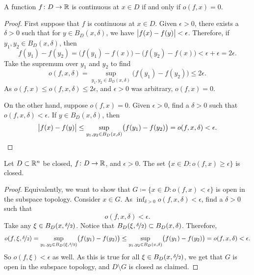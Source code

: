 \begin{prop}
\pagebreak[2]
A function
$f \colon D \to {\mathbb{R}}$ is continuous at $x \in D$ if and only if $o(f,x) = 0$.
\end{prop}

\begin{proof}
First suppose that $f$ is continuous at $x \in D$.  Given $\epsilon > 0$,
there exists a $\delta > 0$ such that for $y \in B_D(x,\delta)$,
we have $\bigl\lvert {f(x)-f(y)} \bigr\rvert < \epsilon$.  Therefore, if $y_1,y_2 \in
B_D(x,\delta)$, then
\begin{equation*}
f(y_1)-f(y_2) =
\bigl(f(y_1)-f(x)\bigr)-\bigl(f(y_2)-f(x)\bigr) < \epsilon + \epsilon = 2 \epsilon .
\end{equation*}
Take the supremum over $y_1$ and $y_2$ to find
\begin{equation*}
o(f,x,\delta) = 
\sup_{y_1,y_2 \in B_D(x,\delta)} \bigl(f(y_1)-f(y_2)\bigr)
\leq
2 \epsilon .
\end{equation*}
As $o(f,x) \leq o(f,x,\delta) \leq 2\epsilon$, and $\epsilon > 0$ was arbitrary,
$o(f,x) = 0$.

On the other hand, suppose $o(f,x) = 0$.  Given $\epsilon > 0$,
find a $\delta > 0$ such that $o(f,x,\delta) < \epsilon$.  If
$y \in B_D(x,\delta)$, then
\begin{equation*}
\bigl\lvert {f(x)-f(y)} \bigr\rvert
\leq
\sup_{y_1,y_2 \in B_D(x,\delta)} \bigl(f(y_1)-f(y_2)\bigr)
=
o(f,x,\delta) < \epsilon. \qedhere
\end{equation*}
\end{proof}

\begin{prop} \label{prop:seclosed}
Let $D \subset {\mathbb{R}}^n$ be closed,
$f \colon D \to {\mathbb{R}}$, and $\epsilon > 0$.
The set $\bigl\{ x \in D : o(f,x) \geq \epsilon \bigr\}$ is closed.
\end{prop}

\begin{proof}
Equivalently, we want to show that
$G \coloneqq \bigl\{ x \in D : o(f,x) < \epsilon \bigr\}$ is open in the subspace topology.
Consider $x \in G$.
As $\inf_{\delta > 0} o(f,x,\delta) < \epsilon$, find a $\delta > 0$ such
that
\begin{equation*}
o(f,x,\delta) < \epsilon .
\end{equation*}
Take any $\xi \in B_D(x,\nicefrac{\delta}{2})$.  Notice that
$B_D(\xi,\nicefrac{\delta}{2}) \subset B_D(x,\delta)$.  Therefore,
\begin{equation*}
o(f,\xi,\nicefrac{\delta}{2}) =
\sup_{y_1,y_2 \in B_D(\xi,\nicefrac{\delta}{2})} \bigl(f(y_1)-f(y_2)\bigr) 
\leq
\sup_{y_1,y_2 \in B_D(x,\delta)} \bigl(f(y_1)-f(y_2)\bigr) = o(f,x,\delta) <
\epsilon .
\end{equation*}
So $o(f,\xi) < \epsilon$ as well.  As this is true for all $\xi \in
B_D(x,\nicefrac{\delta}{2})$, we get that $G$ is open in the subspace
topology, and $D \setminus G$ is closed as claimed.
\end{proof}


